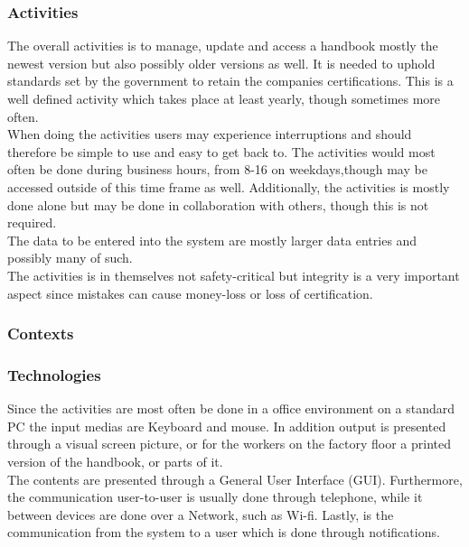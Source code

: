 \subsubsection*{Activities}
The overall activities is to manage, update and access a handbook mostly the newest version but also possibly older versions as well. 
It is needed to uphold standards set by the government to retain the companies certifications.
This is a well defined activity which takes place at least yearly, though sometimes more often.
\\\indent
When doing the activities users may experience interruptions and should therefore be simple to use and easy to get back to.
The activities would most often be done during business hours, from 8-16 on weekdays,though may be accessed outside of this time frame as well.
Additionally, the activities is mostly done alone but may be done in collaboration with others, though this is not required.
\\\indent
The data to be entered into the system are mostly larger data entries and possibly many of such.
\\\indent
The activities is in themselves not safety-critical but integrity is a very important aspect since mistakes can cause money-loss or loss of certification.

\subsubsection*{Contexts}




\subsubsection*{Technologies}
Since the activities are most often be done in a office environment on a standard PC the input medias are Keyboard and mouse.
In addition output is presented through a visual screen picture, or for the workers on the factory floor a printed version of the handbook, or parts of it.
\\\indent
The contents are presented through a General User Interface (GUI).
Furthermore, the communication user-to-user is usually done through telephone, while it between devices are done over a Network, such as Wi-fi.
Lastly, is the communication from the system to a user which is done through notifications.













